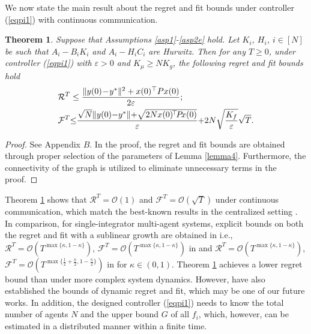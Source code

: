 \documentclass[final,5p,times,twocolumn,authoryear]{elsarticle}
\newtheorem{theorem}{ {Theorem}}
\begin{document}
	
	We now state the main result about the regret and fit bounds under controller (\ref{eqpi1}) with continuous communication.
	
	\begin{theorem}\label{th1}
		Suppose that Assumptions \ref{asp1}-\ref{asp2e} hold. Let $K_i$, $H_i$, $i\in[N]$ be such that $A_i-B_iK_i$ and $A_i-H_iC_i$ are Hurwitz. Then for any $T\ge0$, under controller (\ref{eqpi1}) with $\varepsilon>0$ and $K_\mu \ge NK_g$, the following regret and fit bounds hold
		\begin{align}
			&\mathcal{R}^T\le \frac{\|y(0)\!-\!y^*\|^2 + x(0)^\top P x(0)}{2\varepsilon};\notag\\
			&\mathcal{F}^T {\le} \frac{\sqrt{N}\|y(0){-}y^*\| {+}\sqrt{2N x(0)^{\!\top} \!P\! x(0)}}{\varepsilon}  {+}  2N\sqrt{\frac{K_f}{\varepsilon}}\sqrt{T}.\notag
		\end{align}
	\end{theorem}
	
	\begin{proof}	
		See Appendix $B$.  In the proof, the regret and fit bounds are obtained through proper  selection of the parameters of Lemma \ref{lemma4}. Furthermore, the connectivity of the graph is utilized to eliminate unnecessary terms in the proof.
	\end{proof}
	
	\begin{remark}\label{remark2}		
		Theorem \ref{th1} shows that $\mathcal{R}^T=\mathcal{O}(1)$ and $\mathcal{F}^T = \mathcal{O}(\sqrt{T})$ under continuous communication, which match the best-known results in the centralized setting \citep{pater2017}.
		In comparison, for single-integrator multi-agent systems, explicit bounds on both the regret and fit with a sublinear growth are obtained in \citet{yi2020,li2022}  i.e., $\mathcal{R}^T=\mathcal{O}(T^{\max\{\kappa,1-\kappa\}})$, $\mathcal{F}^T = \mathcal{O}(T^{\max\{\kappa,1-\kappa\}})$ in \citet{yi2020} and $\mathcal{R}^T= \mathcal{O}(T^{\max\{\kappa,1-\kappa\}})$, $\mathcal{F}^T = \mathcal{O}(T^{\max\{\frac{1}{2}+\frac{\kappa}{2},1-\frac{\kappa}{2}\}})$ in \citet{li2022} for $\kappa\in(0,1)$. Theorem \ref{th1} achieves a lower regret bound than \citet{yi2020,li2022} under more complex system dynamics. 
		 However, \citet{yi2020,li2022} have also established the bounds of dynamic regret and fit, which may be one of our future works. In addition, the designed controller (\ref{eqpi1}) needs to know the total number of agents $N$ and the upper bound $G$ of all $f_i$, which, however, can be estimated in a distributed manner \citep{oli2017} within a finite time.
	\end{remark}
\end{document}
